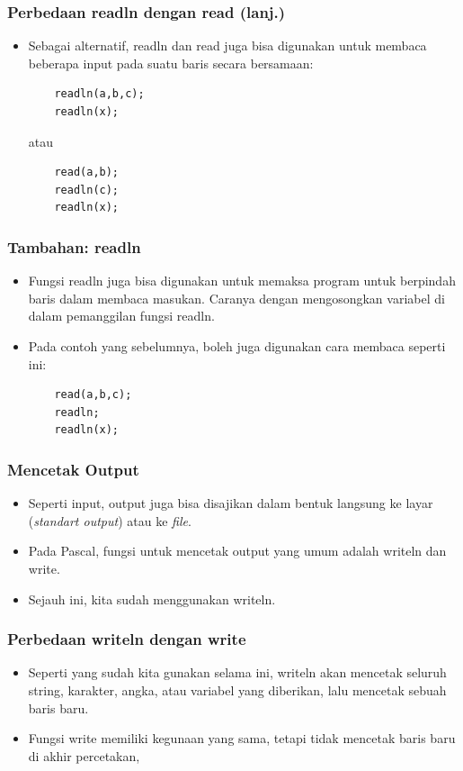 \documentclass{beamer}
\begin{document}
\begin{frame}[fragile]
\frametitle{Perbedaan readln dengan read (lanj.)}
\begin{itemize}
	\item Sebagai alternatif, readln dan read juga bisa digunakan untuk membaca beberapa input pada suatu baris secara bersamaan:
	\begin{lstlisting}
	readln(a,b,c);
	readln(x);
	\end{lstlisting}
	atau
	\begin{lstlisting}
	read(a,b);
	readln(c);
	readln(x);
	\end{lstlisting}
\end{itemize}
\end{frame}

\begin{frame}[fragile]
\frametitle{Tambahan: readln}
\begin{itemize}
	\item Fungsi readln juga bisa digunakan untuk memaksa program untuk berpindah baris dalam membaca masukan. Caranya dengan mengosongkan variabel di dalam pemanggilan fungsi readln.
	\item Pada contoh yang sebelumnya, boleh juga digunakan cara membaca seperti ini:
	\begin{lstlisting}
	read(a,b,c);
	readln;
	readln(x);
	\end{lstlisting}
\end{itemize}
\end{frame}

\begin{frame}
\frametitle{Mencetak Output}
\begin{itemize}
	\item Seperti input, output juga bisa disajikan dalam bentuk langsung ke layar (\textit{standart output}) atau ke \textit{file}.
	\item Pada Pascal, fungsi untuk mencetak output yang umum adalah \alert{writeln} dan \alert{write}.
	\item Sejauh ini, kita sudah menggunakan writeln.
\end{itemize}
\end{frame}

\begin{frame}[fragile]
\frametitle{Perbedaan writeln dengan write}
\begin{itemize}
	\item Seperti yang sudah kita gunakan selama ini, writeln akan mencetak seluruh string, karakter, angka, atau variabel yang diberikan, lalu \alert{mencetak sebuah baris baru}.
	\item Fungsi write memiliki kegunaan yang sama, tetapi tidak \alert{mencetak baris baru} di akhir percetakan,
\end{itemize}
\end{frame}
\end{document}
